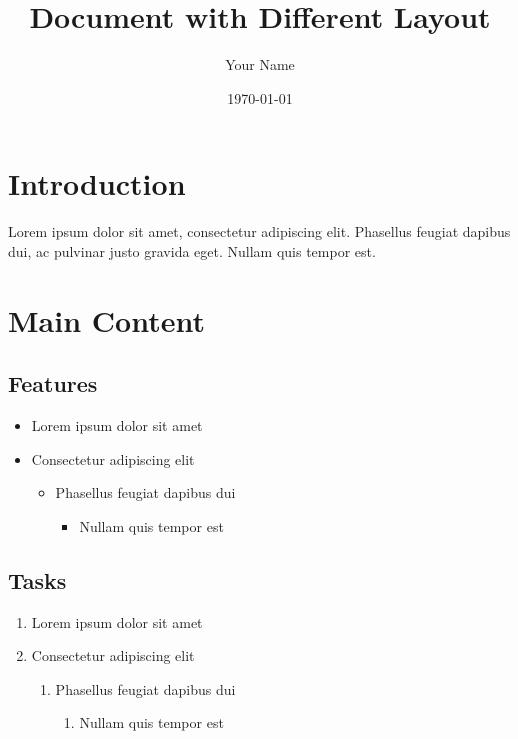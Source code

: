 \documentclass{article}
\begin{document}
\title{Document with Different Layout}
\author{Your Name}
\date{\today}
\maketitle

\section{Introduction}
Lorem ipsum dolor sit amet, consectetur adipiscing elit. Phasellus feugiat dapibus dui, ac pulvinar justo gravida eget. Nullam quis tempor est.

\section{Main Content}
\subsection{Features}
\begin{itemize}[label=\textbullet]
    \item Lorem ipsum dolor sit amet
    \item Consectetur adipiscing elit
    \begin{itemize}[label=-]
        \item Phasellus feugiat dapibus dui
        \begin{itemize}[label=*]
            \item Nullam quis tempor est
        \end{itemize}
    \end{itemize}
\end{itemize}

\subsection{Tasks}
\begin{enumerate}
    \item Lorem ipsum dolor sit amet
    \item Consectetur adipiscing elit
    \begin{enumerate}
        \item Phasellus feugiat dapibus dui
        \begin{enumerate}
            \item Nullam quis tempor est
        \end{enumerate}
    \end{enumerate}
\end{enumerate}
\end{document}
